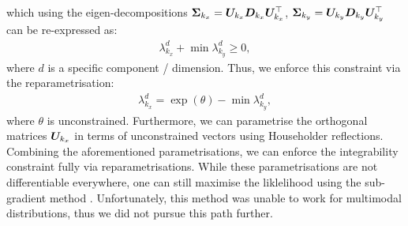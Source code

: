 \documentclass[a4paper,12pt,twoside,openright]{report}
\theoremstyle{definition}
\begin{document}
which using the eigen-decompositions ${\bm{\Sigma}}_{k_x}={\bm{U}}_{k_x} {\bm{D}}_{k_x} {\bm{U}}^{\top}_{k_x}$,  ${\bm{\Sigma}}_{k_y}={\bm{U}}_{k_y} {\bm{D}}_{k_y} {\bm{U}}^{\top}_{k_y}$ can be re-expressed as: 
\begin{align*}
  \lambda_{k_x}^d + \min\lambda_{k_y}^d \geq 0,
\end{align*}
where $d$ is a specific component / dimension. Thus, we enforce this constraint via the reparametrisation:
\begin{align*}
   \lambda_{k_x}^d = \exp(\theta) - \min\lambda_{k_y}^d ,
\end{align*}
where  $\theta$ is unconstrained. Furthermore, we can parametrise the orthogonal matrices ${\bm{U}}_{k_x}$ in terms of unconstrained vectors using Householder reflections. Combining the aforementioned parametrisations, we can enforce the integrability constraint fully via reparametrisations. While these parametrisations are not differentiable everywhere, one can still maximise the liklelihood using the sub-gradient method \citep{shor1991development}. Unfortunately, this method was unable to work for multimodal distributions, thus we did not pursue this path further.



 
                                                                                         
\end{document}
